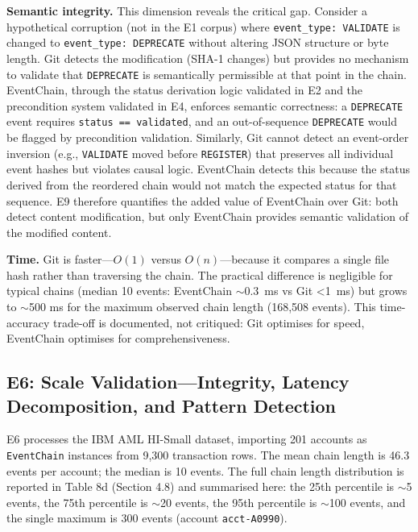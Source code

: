 \textbf{Semantic integrity.} This dimension reveals the critical gap. Consider a hypothetical corruption (not in the E1 corpus) where \texttt{event\_type:\ VALIDATE} is changed to \texttt{event\_type:\ DEPRECATE} without altering JSON structure or byte length. Git detects the modification (SHA-1 changes) but provides no mechanism to validate that \texttt{DEPRECATE} is semantically permissible at that point in the chain. EventChain, through the status derivation logic validated in E2 and the precondition system validated in E4, enforces semantic correctness: a \texttt{DEPRECATE} event requires \texttt{status\ ==\ validated}, and an out-of-sequence \texttt{DEPRECATE} would be flagged by precondition validation. Similarly, Git cannot detect an event-order inversion (e.g., \texttt{VALIDATE} moved before \texttt{REGISTER}) that preserves all individual event hashes but violates causal logic. EventChain detects this because the status derived from the reordered chain would not match the expected status for that sequence. E9 therefore quantifies the added value of EventChain over Git: both detect content modification, but only EventChain provides semantic validation of the modified content.

\textbf{Time.} Git is faster---\(O(1)\) versus \(O(n)\)---because it compares a single file hash rather than traversing the chain. The practical difference is negligible for typical chains (median 10 events: EventChain $\sim$0.3~ms vs Git <1~ms) but grows to $\sim$500 ms for the maximum observed chain length (168,508 events). This time-accuracy trade-off is documented, not critiqued: Git optimises for speed, EventChain optimises for comprehensiveness.

\subsection{E6: Scale Validation---Integrity, Latency Decomposition, and Pattern Detection}\label{e6-scale-validationintegrity-latency-decomposition-and-pattern-detection}

E6 processes the IBM AML HI-Small dataset, importing 201 accounts as \texttt{EventChain} instances from 9,300 transaction rows. The mean chain length is 46.3 events per account; the median is 10 events. The full chain length distribution is reported in Table 8d (Section 4.8) and summarised here: the 25th percentile is $\sim$5 events, the 75th percentile is $\sim$20 events, the 95th percentile is $\sim$100 events, and the single maximum is 300 events (account \texttt{acct-A0990}).

